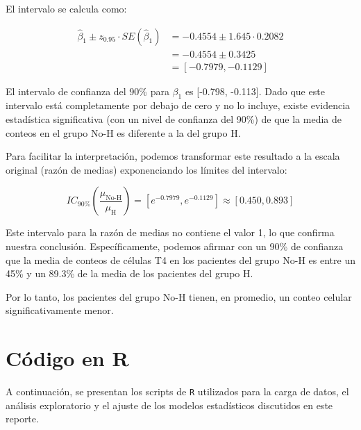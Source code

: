 \newpage
El intervalo se calcula como:

\begin{align*}
\widehat{\beta}_1 \pm z_{0.95} \cdot SE(\hat{\beta}_1) &= -0.4554 \pm 1.645 \cdot 0.2082 \\
&= -0.4554 \pm 0.3425 \\
&= [-0.7979, -0.1129]
\end{align*}

El intervalo de confianza del 90\% para $\beta_1$ es [-0.798, -0.113]. Dado que este intervalo está completamente por debajo de cero y no lo incluye, existe evidencia estadística significativa (con un nivel de confianza del 90\%) de que la media de conteos en el grupo No-H es diferente a la del grupo H.

Para facilitar la interpretación, podemos transformar este resultado a la escala original (razón de medias) exponenciando los límites del intervalo:

\begin{equation*}
    IC_{90\%}\left(\frac{\mu_{\text{No-H}}}{\mu_{\text{H}}}\right) = [e^{-0.7979}, e^{-0.1129}] \approx [0.450, 0.893]
\end{equation*}

\begin{center}
\end{center}

Este intervalo para la razón de medias no contiene el valor 1, lo que confirma nuestra conclusión. Específicamente, podemos afirmar con un 90\% de confianza que la media de conteos de células T4 en los pacientes del grupo No-H es entre un 45\% y un 89.3\% de la media de los pacientes del grupo H. 

\begin{tcolorbox}
Por lo tanto, los pacientes del grupo No-H tienen, en promedio, un conteo celular significativamente menor.
\end{tcolorbox}


\newpage

\appendix  
\section{Código en \textcolor{CIMATRed}{R}}

A continuación, se presentan los scripts de \texttt{R} utilizados para la carga de datos, el análisis exploratorio y el ajuste de los modelos estadísticos discutidos en este reporte.

